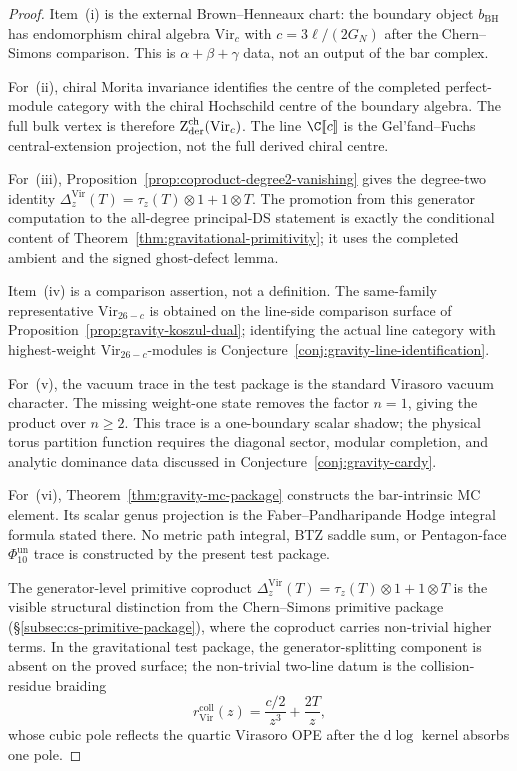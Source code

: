 \begin{proof}
Item~(i) is the external Brown--Henneaux chart: the boundary object
\(b_{\mathrm{BH}}\) has endomorphism chiral algebra
\(\mathrm{Vir}_c\) with \(c=3\ell/(2G_N)\) after the Chern--Simons
comparison.  This is \(\alpha+\beta+\gamma\) data, not an output of
the bar complex.

For~(ii), chiral Morita invariance identifies the centre of the
completed perfect-module category with the chiral Hochschild centre
of the boundary algebra.  The full bulk vertex is therefore
\(\operatorname{Z}_{\mathrm{der}}^{\mathrm{ch}}(\mathrm{Vir}_c)\).  The line
\(\C[\![c]\!]\) is the Gel'fand--Fuchs central-extension projection,
not the full derived chiral centre.

For~(iii), Proposition~\ref{prop:coproduct-degree2-vanishing} gives
the degree-two identity
\(\Delta_z^{\mathrm{Vir}}(T)=\tau_z(T)\otimes1+1\otimes T\).
The promotion from this generator computation to the all-degree
principal-DS statement is exactly the conditional content of
Theorem~\ref{thm:gravitational-primitivity}; it uses the completed
ambient and the signed ghost-defect lemma.

Item~(iv) is a comparison assertion, not a definition.  The
same-family representative \(\mathrm{Vir}_{26-c}\) is obtained on the
line-side comparison surface of
Proposition~\ref{prop:gravity-koszul-dual}; identifying the
actual line category with highest-weight
\(\mathrm{Vir}_{26-c}\)-modules is
Conjecture~\ref{conj:gravity-line-identification}.

For~(v), the vacuum trace in the test package is the standard
Virasoro vacuum character.  The missing weight-one state removes the
factor \(n=1\), giving the product over \(n\ge2\).  This trace is a
one-boundary scalar shadow; the physical torus partition function
requires the diagonal sector, modular completion, and analytic
dominance data discussed in Conjecture~\ref{conj:gravity-cardy}.

For~(vi), Theorem~\ref{thm:gravity-mc-package} constructs the
bar-intrinsic MC element.  Its scalar genus projection is the
Faber--Pandharipande Hodge integral formula stated there.  No
metric path integral, BTZ saddle sum, or Pentagon-face
\(\Phi_{10}^{\mathrm{un}}\) trace is constructed by the present
test package.

The generator-level primitive coproduct
\(\Delta_z^{\mathrm{Vir}}(T)=\tau_z(T)\otimes1+1\otimes T\)
is the visible structural distinction from the Chern--Simons
primitive package (\S\ref{subsec:cs-primitive-package}), where the
coproduct carries non-trivial higher terms.
In the gravitational test package, the generator-splitting component
is absent on the proved surface; the non-trivial two-line datum is the
collision-residue braiding
\[
r_{\mathrm{Vir}}^{\mathrm{coll}}(z)
=\frac{c/2}{z^3}+\frac{2T}{z},
\]
whose cubic pole reflects the quartic Virasoro OPE after the
\(\mathrm d\log\) kernel absorbs one pole.
\end{proof}

